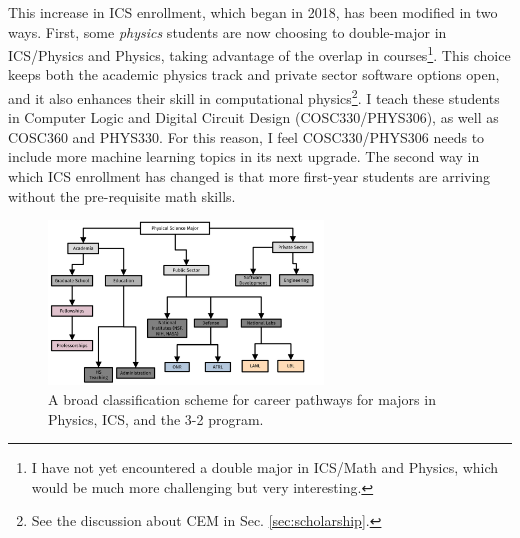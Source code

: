 \documentclass[../../main.tex]{subfiles}
\begin{document}
This increase in ICS enrollment, which began in 2018, has been modified in two ways.  First, some \textit{physics} students are now choosing to double-major in ICS/Physics and Physics, taking advantage of the overlap in courses\footnote{I have not yet encountered a double major in ICS/Math and Physics, which would be much more challenging but very interesting.}.  This choice keeps both the academic physics track and private sector software options open, and it also enhances their skill in computational physics\footnote{See the discussion about CEM in Sec. \ref{sec:scholarship}.}.  I teach these students in Computer Logic and Digital Circuit Design (COSC330/PHYS306), as well as COSC360 and PHYS330.  For this reason, I feel COSC330/PHYS306 needs to include more machine learning topics in its next upgrade.  The second way in which ICS enrollment has changed is that more first-year students are arriving without the pre-requisite math skills.

\begin{figure}[hb]
\centering
\includegraphics[width=0.65\textwidth]{figures/tree.pdf}
\caption{\label{fig:tree}  A broad classification scheme for career pathways for majors in Physics, ICS, and the 3-2 program.}
\end{figure}
\end{document}
